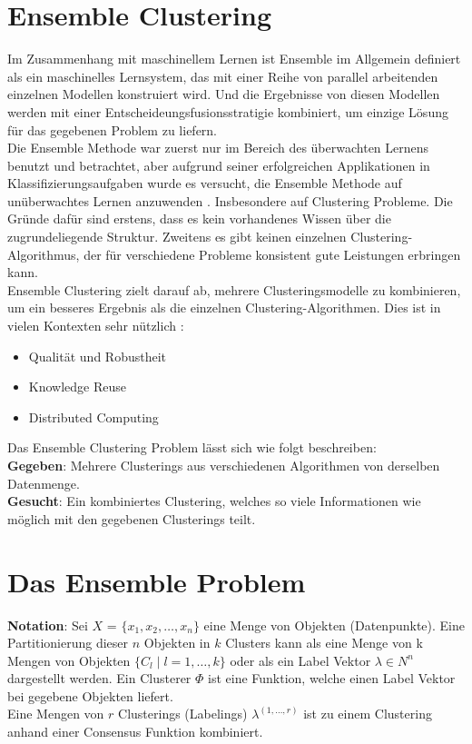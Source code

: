 \documentclass[runningheads]{llncs}
\begin{document}
\section{Ensemble Clustering}
Im Zusammenhang mit maschinellem Lernen ist Ensemble im Allgemein definiert als ein maschinelles Lernsystem, das mit einer Reihe von parallel arbeitenden einzelnen Modellen konstruiert wird. Und die Ergebnisse von diesen Modellen werden mit einer Entscheideungsfusionsstratigie kombiniert, um einzige Lösung für das gegebenen Problem zu liefern.\\
 Die Ensemble Methode war zuerst nur im Bereich des überwachten Lernens benutzt und betrachtet, aber aufgrund seiner erfolgreichen Applikationen in Klassifizierungsaufgaben wurde es versucht, die Ensemble Methode auf unüberwachtes Lernen anzuwenden \cite{alqurashi2019clustering}. Insbesondere auf Clustering Probleme. Die Gründe dafür sind erstens, dass es kein vorhandenes Wissen über die zugrundeliegende Struktur. Zweitens es gibt keinen einzelnen Clustering-Algorithmus, der für verschiedene Probleme konsistent gute Leistungen erbringen kann.\\
 Ensemble Clustering zielt darauf ab, mehrere Clusteringsmodelle zu kombinieren, um ein besseres Ergebnis als die einzelnen Clustering-Algorithmen. Dies ist in vielen Kontexten sehr nützlich \cite{strehl2002cluster}: 
\begin{itemize}
	\item Qualität und Robustheit  
	\item Knowledge Reuse 
	\item Distributed Computing     
\end{itemize}
Das Ensemble Clustering Problem lässt sich wie folgt beschreiben:\\
\textbf{Gegeben}: Mehrere Clusterings aus verschiedenen Algorithmen von derselben Datenmenge.\\
\textbf{Gesucht}: Ein kombiniertes Clustering, welches so viele Informationen wie möglich mit den gegebenen Clusterings teilt. 


\section{Das Ensemble Problem}
\textbf{Notation}: Sei $X$ = $\{x_1, x_2, \ldots, x_n\}$ eine Menge von Objekten (Datenpunkte). Eine Partitionierung dieser $n$ Objekten in $k$ Clusters kann als eine Menge von k Mengen von Objekten $\{C_{l} \mid l = 1, \ldots, k\}$ oder als ein Label Vektor $\lambda \in {N}^{n}$ dargestellt werden. Ein Clusterer $\Phi$ ist eine Funktion, welche einen Label Vektor bei gegebene Objekten liefert.\\
Eine Mengen von $r$ Clusterings (Labelings) $\lambda^{(1, \dots, r)}$ ist zu einem Clustering anhand einer Consensus Funktion kombiniert. 
\end{document}
